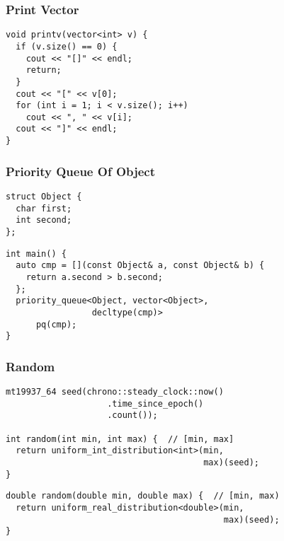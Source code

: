 \documentclass[twoside]{article}
\begin{document}
\begin{multicols*}{2}
\subsubsectionfont{\large\bfseries\sffamily\underline}
\subsubsection*{Print Vector}
\begin{verbatim}
void printv(vector<int> v) {
  if (v.size() == 0) {
    cout << "[]" << endl;
    return;
  }
  cout << "[" << v[0];
  for (int i = 1; i < v.size(); i++)
    cout << ", " << v[i];
  cout << "]" << endl;
}
\end{verbatim}

\subsubsectionfont{\large\bfseries\sffamily\underline}
\subsubsection*{Priority Queue Of Object}
\begin{verbatim}
struct Object {
  char first;
  int second;
};
\end{verbatim}
\vspace{-12pt}
\begin{verbatim}
int main() {
  auto cmp = [](const Object& a, const Object& b) {
    return a.second > b.second;
  };
  priority_queue<Object, vector<Object>,
                 decltype(cmp)>
      pq(cmp);
}
\end{verbatim}

\subsubsectionfont{\large\bfseries\sffamily\underline}
\subsubsection*{Random}
\begin{verbatim}
mt19937_64 seed(chrono::steady_clock::now()
                    .time_since_epoch()
                    .count());

int random(int min, int max) {  // [min, max]
  return uniform_int_distribution<int>(min,
                                       max)(seed);
}
\end{verbatim}
\vspace{-12pt}
\begin{verbatim}
double random(double min, double max) {  // [min, max)
  return uniform_real_distribution<double>(min,
                                           max)(seed);
}
\end{verbatim}


\end{multicols*}
\end{document}
